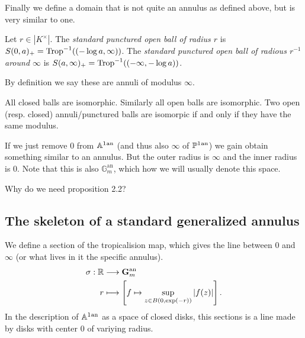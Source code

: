 \documentclass[a4paper]{article}
\newcommand{\an}{\ensuremath{{}^{\mathrm{an}}}}
\begin{document}
Finally we define a domain that is not quite an annulus as defined above, but is very similar to one. 
\begin{definition}
	Let $r \in |K^{\times }|$. The \emph{standard punctured open ball of radius $r$ } is $S(0, a)_+ = \operatorname{Trop}^{-1}((-\log a, \infty))$. 
	The \emph{standard punctured open ball of radious $r^{-1}$ around $\infty$} is $S(a, \infty)_+ = \operatorname{Trop}^{-1}((-\infty, -\log a))$. 

	By definition we say these are annuli of modulus $\infty$. 
\end{definition}

All closed balls are isomorphic. Similarly all open balls are isomorphic. 
Two open (resp. closed) annuli/punctured balls are isomorpic if and only if they have the same modulus. 

\begin{remark}
	If we just remove $0$ from $\aff^{1}\an$ (and thus also $\infty$ of $\pro^{1}\an$) we gain obtain something similar to an annulus. But the outer radius is $\infty$ and the inner radius is $0$. 
	Note that this is also $\mathbb G^{\mathrm{an}}_m$, which how we will usually denote this space. 
\end{remark}



Why do we need proposition 2.2? 

\subsection{The skeleton of a standard generalized annulus} \label{sec:the_skeleton_of_a_standard_generalized_annulus}
We define a section of the tropicalision map, which gives the line between $0$ and $\infty$ (or what lives in it the specific annulus). 
\begin{align*}
	\sigma: \mathbb{R} &\longrightarrow \mathbf G_m^{\mathrm{an}} \\
	r &\longmapsto \left[f \mapsto \sup_{z \in B(0,\exp(-r))} |f(z)|\right]
.\end{align*}
In the description of $\aff^{1}\an$ as a space of closed disks, this sections is a line made by disks with center $0$ of variying radius.
\end{document}
